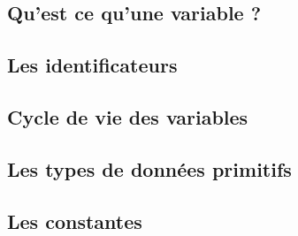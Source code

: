 \subsection*{Qu'est ce qu'une variable ?}



\subsection*{Les identificateurs}







\subsection*{Cycle de vie des variables}





















\subsection*{Les types de données primitifs}











\subsection*{Les constantes}


  







